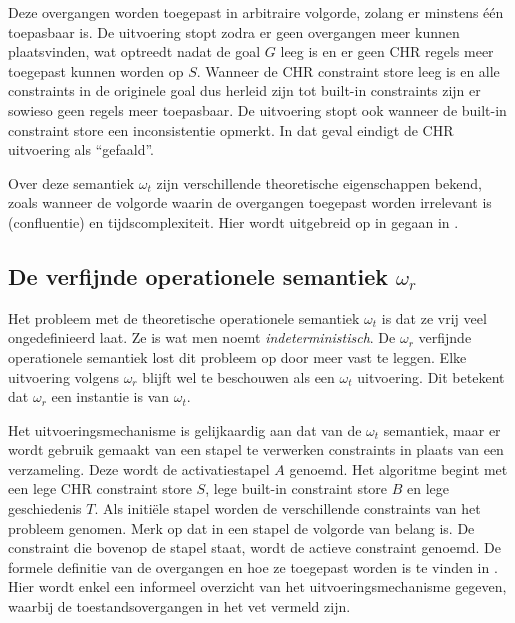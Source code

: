 Deze overgangen worden toegepast in arbitraire volgorde, zolang er minstens \'e\'en toepasbaar is. De uitvoering stopt zodra er geen overgangen meer kunnen plaatsvinden, wat optreedt nadat de goal $G$ leeg is en er geen CHR regels meer toegepast kunnen worden op $S$. Wanneer de CHR constraint store leeg is en alle constraints in de originele goal dus herleid zijn tot built-in constraints zijn er sowieso geen regels meer toepasbaar. De uitvoering stopt ook wanneer de built-in constraint store een inconsistentie opmerkt. In dat geval eindigt de CHR uitvoering als ``gefaald''.

Over deze semantiek $\omega_t$ zijn verschillende theoretische eigenschappen bekend, zoals wanneer de volgorde waarin de overgangen toegepast worden irrelevant is (confluentie) en tijdscomplexiteit. Hier wordt uitgebreid op in gegaan in \cite{tomsphdthesis}.

\subsection{De verfijnde operationele semantiek $\omega_r$} \label{sec:omegar}

Het probleem met de theoretische operationele semantiek $\omega_t$ is dat ze vrij veel ongedefinieerd laat. Ze is wat men noemt {\em indeterministisch}. De $\omega_r$ verfijnde operationele semantiek lost dit probleem op door meer vast te leggen. Elke uitvoering volgens $\omega_r$ blijft wel te beschouwen als een $\omega_t$ uitvoering. Dit betekent dat $\omega_r$ een instantie is van $\omega_t$. 

Het uitvoeringsmechanisme is gelijkaardig aan dat van de $\omega_t$ semantiek, maar er wordt gebruik gemaakt van een stapel te verwerken constraints in plaats van een verzameling. Deze wordt de activatiestapel $A$ genoemd. Het algoritme begint met een lege CHR constraint store $S$, lege built-in constraint store $B$ en lege geschiedenis $T$. Als initi\"ele stapel worden de verschillende constraints van het probleem genomen. Merk op dat in een stapel de volgorde van belang is. De constraint die bovenop de stapel staat, wordt de actieve constraint genoemd. De formele definitie van de overgangen en hoe ze toegepast worden is te vinden in \cite{tomsphdthesis}. Hier wordt enkel een informeel overzicht van het uitvoeringsmechanisme gegeven, waarbij de toestandsovergangen in het vet vermeld zijn.

